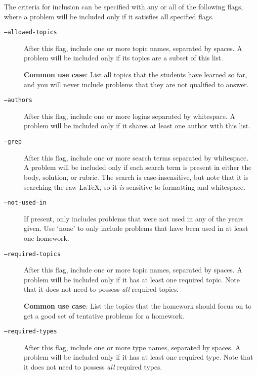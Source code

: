    The criteria for inclusion can be specified with any or all of the 
    following flags, where a problem will be included only if it satisfies 
    all specified flags.
    \begin{description}
      \item[\texttt{--allowed-topics}] 
        After this flag, include one or more topic names, separated by 
        spaces. A problem will be included only if its topics are a subset 
        of this list. 
      
        \textbf{Common use case}: List all topics that the students have 
        learned so far, and you will never include problems that they are 
        not qualified to answer.
      \item[\texttt{--authors}] 
        After this flag, include one or more 
        logins separated by whitespace. A problem will be included only if
        it shares at least one author with this list.
      \item[\texttt{--grep}] 
        After this flag, include one or more search 
        terms separated by whitespace. A problem will be included only if 
        each search term is present in either the body, solution, or rubric. 
        The search is case-insensitive, but note that it is searching the 
        raw \LaTeX, so it \textit{is} sensitive to formatting and whitespace.
      \item[\texttt{--not-used-in}] 
        If present, only includes problems that 
        were not used in any of the years given. Use `none' to only 
        include problems that have been used in at least one homework.
      \item[\texttt{--required-topics}] 
        After this flag, include one or more 
        topic names, separated by spaces. A problem will be included only 
        if it has at least one required topic. Note that it does not need 
        to possess \textit{all} required topics. 
      
        \textbf{Common use case}: List the topics that the homework should 
        focus on to get a good set of tentative problems for a homework.
      \item[\texttt{--required-types}] 
        After this flag, include one or more type
        names, separated by spaces. A problem will be included only if it has 
        at least one required type. Note that it does not need to possess 
        \textit{all} required types. 
        

\end{description}
